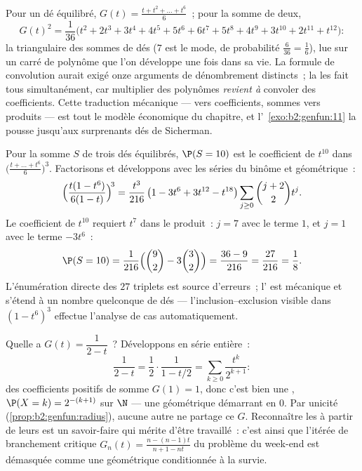 \begin{example}\label{ex:b2:genfun:twodice}
Pour un dé équilibré, $G(t) = \frac{t + t^2 + \dots + t^6}{6}$~;
pour la somme de deux,
\[
G(t)^2 = \frac{1}{36}\bigl(t^2 + 2t^3 + 3t^4 + 4t^5 + 5t^6 +
6t^7 + 5t^8 + 4t^9 + 3t^{10} + 2t^{11} + t^{12}\bigr) :
\]
la  triangulaire des sommes de dés ($7$ est le mode, de
probabilité $\frac6{36} = \frac16$), lue sur un carré de
polynôme que l'on développe une fois dans sa vie. La
formule de convolution aurait exigé onze arguments de dénombrement
distincts~; la  les fait tous simultanément,
car multiplier des polynômes \emph{revient à} convoler des
coefficients. Cette traduction mécanique ---
 vers coefficients, sommes vers produits --- est tout le
modèle économique du chapitre, et
l'~\cref{exo:b2:genfun:11} la pousse jusqu'aux surprenants
dés de Sicherman.
\end{example}

\begin{example}\label{ex:b2:genfun:threedice}
Pour la somme $S$ de trois dés équilibrés, $\P(S = 10)$ est le
coefficient de $t^{10}$ dans $\bigl(\frac{t + \dots +
t^6}6\bigr)^3$. Factorisons et développons avec les séries du
binôme et géométrique~:
\[
\Bigl(\frac{t(1 - t^6)}{6(1 - t)}\Bigr)^{\!3}
= \frac{t^3}{216}\,\bigl(1 - 3t^6 + 3t^{12} -
t^{18}\bigr)\sum_{j\geq0}\binom{j+2}2t^j .
\]
Le coefficient de $t^{10}$ requiert $t^7$ dans le produit~:
$j = 7$ avec le terme $1$, et $j = 1$ avec le terme
$-3t^6$~:
\[
\P(S = 10) = \frac{1}{216}\Bigl(\binom92 -
3\binom32\Bigr) = \frac{36 - 9}{216} = \frac{27}{216} =
\frac18 .
\]
L'énumération directe des $27$ triplets est source d'erreurs~; l'
est mécanique et s'étend à un nombre quelconque de dés ---
l'inclusion--exclusion visible dans $(1 - t^6)^3$ effectue
l'analyse de cas automatiquement.
\end{example}

\begin{example}\label{ex:b2:genfun:identify}
Quelle  a $G(t) = \dfrac1{2 - t}$~? Développons en série
entière~:
\[
\frac{1}{2 - t} = \frac12\cdot\frac1{1 - t/2}
= \sum_{k\geq0}\frac{t^k}{2^{k+1}} :
\]
des coefficients positifs de somme $G(1) = 1$, donc c'est bien une
, $\P(X = k) = 2^{-(k+1)}$ sur $\N$ --- une
 géométrique démarrant en $0$. Par unicité
(\cref{prop:b2:genfun:radius}), aucune autre  ne partage ce
$G$. Reconnaître les  à partir de leurs 
est un savoir-faire qui mérite d'être travaillé~: c'est ainsi que
l'itérée de branchement critique $G_n(t) = \frac{n - (n-1)t}{n+1 - nt}$
du problème du week-end est démasquée comme une  géométrique
conditionnée à la survie.
\end{example}

